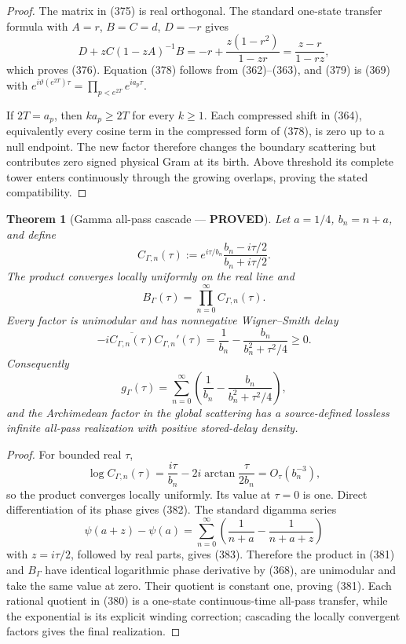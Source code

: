 \documentclass[11pt]{article}
\newtheorem{theorem}{Theorem}
\newcommand{\PROVED}{\textcolor{green!45!black}{\textbf{PROVED}}}
\begin{document}
\begin{proof}
The matrix in (375) is real orthogonal.  The standard one-state transfer
formula with $A=r$, $B=C=d$, $D=-r$ gives
\[
 D+zC(1-zA)^{-1}B
 =-r+\frac{z(1-r^2)}{1-zr}
 =\frac{z-r}{1-rz},
\]
which proves (376).  Equation (378) follows from (362)--(363), and (379)
is (369) with
$e^{i\vartheta(e^{2T})\tau}=\prod_{p<e^{2T}}e^{ia_p\tau}$.

If $2T=a_p$, then $k a_p\ge2T$ for every $k\ge1$.  Each compressed shift in
(364), equivalently every cosine term in the compressed form of (378), is
zero up to a null endpoint.  The new factor therefore changes the boundary
scattering but contributes zero signed physical Gram at its birth.  Above
threshold its complete tower enters continuously through the growing
overlaps, proving the stated compatibility.
\end{proof}

\begin{theorem}[Gamma all-pass cascade --- \PROVED]
Let $a=1/4$, $b_n=n+a$, and define
\begin{equation}
 C_{\Gamma,n}(\tau):=
 e^{i\tau/b_n}\frac{b_n-i\tau/2}{b_n+i\tau/2}.      \tag{380}
\end{equation}
The product converges locally uniformly on the real line and
\begin{equation}
 \boxed{B_\Gamma(\tau)=\prod_{n=0}^\infty
                  C_{\Gamma,n}(\tau).}              \tag{381}
\end{equation}
Every factor is unimodular and has nonnegative Wigner--Smith delay
\begin{equation}
 -i\overline{C_{\Gamma,n}(\tau)}
       C_{\Gamma,n}'(\tau)
 =\frac1{b_n}-\frac{b_n}{b_n^2+\tau^2/4}\ge0.       \tag{382}
\end{equation}
Consequently
\begin{equation}
 g_\Gamma(\tau)
 =\sum_{n=0}^\infty
 \left(\frac1{b_n}-\frac{b_n}{b_n^2+\tau^2/4}\right), \tag{383}
\end{equation}
and the Archimedean factor in the global scattering has a source-defined
lossless infinite all-pass realization with positive stored-delay density.
\end{theorem}

\begin{proof}
For bounded real $\tau$,
\[
 \log C_{\Gamma,n}(\tau)
 =\frac{i\tau}{b_n}
   -2i\arctan\frac{\tau}{2b_n}
 =O_\tau(b_n^{-3}),
\]
so the product converges locally uniformly.  Its value at $\tau=0$ is one.
Direct differentiation of its phase gives (382).  The standard digamma
series
\[
 \psi(a+z)-\psi(a)
 =\sum_{n=0}^\infty
 \left(\frac1{n+a}-\frac1{n+a+z}\right)
\]
with $z=i\tau/2$, followed by real parts, gives (383).  Therefore the
product in (381) and $B_\Gamma$ have identical logarithmic phase derivative
by (368), are unimodular and take the same value at zero.  Their quotient is
constant one, proving (381).  Each rational quotient in (380) is a
one-state continuous-time all-pass transfer, while the exponential is its
explicit winding correction; cascading the locally convergent factors gives
the final realization.
\end{proof}
\end{document}
